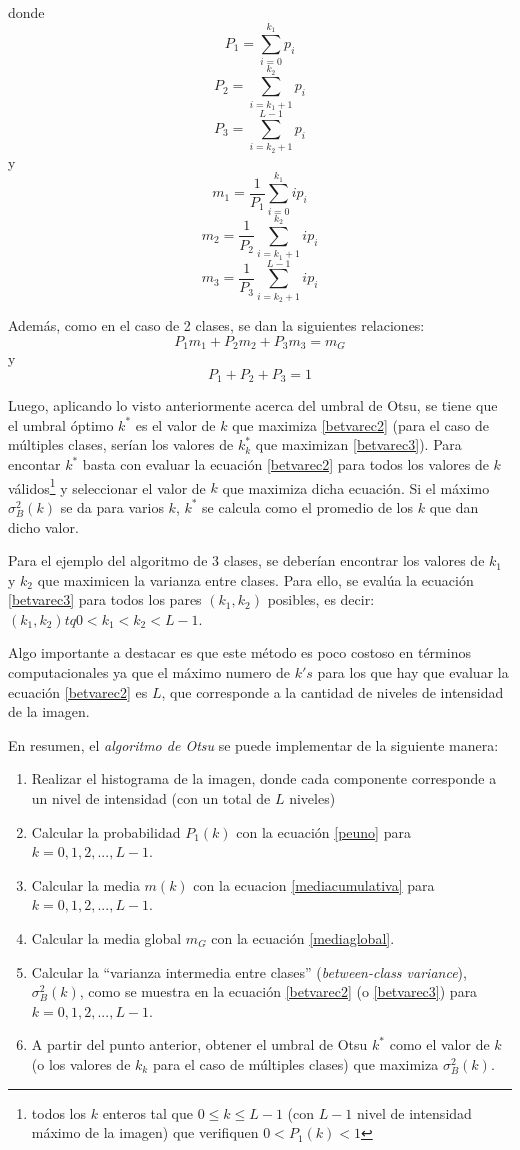 donde $$P_1=\sum_{i=0}^{k_1}p_i$$ $$P_2=\sum_{i=k_1+1}^{k_2}p_i$$  $$P_3=\sum_{i=k_2+1}^{L-1}p_i$$ y $$m_1 = \frac{1}{P_1}\sum_{i=0}^{k_1}ip_i$$  $$m_2 = \frac{1}{P_2}\sum_{i=k_1+1}^{k_2}ip_i$$  $$m_3 = \frac{1}{P_3}\sum_{i=k_2+1}^{L-1}ip_i$$

Además, como en el caso de 2 clases, se dan la siguientes relaciones:
\begin{equation}
  P_1m_1 + P_2m_2 + P_3m_3 = m_G
\end{equation}
y
\begin{equation}
  P_1+P_2+P_3 = 1
\end{equation}

Luego, aplicando lo visto anteriormente acerca del umbral de Otsu, se tiene que el umbral óptimo $k^*$ es el valor de $k$ que maximiza \ref{betvarec2} (para el caso de múltiples clases, serían los valores de $k_k^*$ que maximizan \ref{betvarec3}). Para encontar $k^*$ basta con evaluar la ecuación \ref{betvarec2} para todos los valores de $k$ válidos\footnote{ todos los $k$ enteros tal que $0{\leq}k{\leq}L-1$ (con $L-1$ nivel de intensidad máximo de la imagen) que verifiquen $0<P_1(k)<1$ } y seleccionar el valor de $k$ que maximiza dicha ecuación. Si el máximo ${\sigma}_B^2(k)$ se da para varios $k$, $k^*$ se calcula como el promedio de los $k$ que dan dicho valor.

Para el ejemplo del algoritmo de 3 clases, se deberían encontrar los valores de $k_1$ y $k_2$ que maximicen la varianza entre clases. Para ello, se evalúa la ecuación \ref{betvarec3} para todos los pares $(k_1,k_2)$ posibles, es decir: $(k_1,k_2) tq 0<k_1<k_2<L-1$.

Algo importante a destacar es que este método es poco costoso en términos computacionales ya que el máximo numero de $k's$ para los que hay que evaluar la ecuación \ref{betvarec2} es $L$, que corresponde a la cantidad de niveles de intensidad de la imagen.

En resumen, el \textit{algoritmo de Otsu} se puede implementar de la siguiente manera:
\begin{enumerate}
 \item Realizar el histograma de la imagen, donde cada componente corresponde a un nivel de intensidad (con un total de $L$ niveles)
 \item Calcular la probabilidad $P_1(k)$ con la ecuación \ref{peuno} para $k=0,1,2,...,L-1$.
 \item Calcular la media $m(k)$ con la ecuacion \ref{mediacumulativa} para $k=0,1,2,...,L-1$.
 \item Calcular la media global $m_G$ con la ecuación \ref{mediaglobal}.
 \item Calcular la ``varianza intermedia entre clases'' (\textit{between-class variance}), ${\sigma}_B^2(k)$, como se muestra en la ecuación \ref{betvarec2} (o \ref{betvarec3})  para $k=0,1,2,...,L-1$.
 \item A partir del punto anterior, obtener el umbral de Otsu $k^*$ como el valor de $k$ (o los valores de $k_k$ para el caso de múltiples clases) que maximiza ${\sigma}_B^2(k)$.
\end{enumerate}

